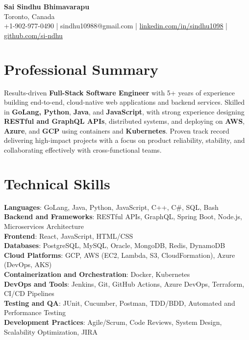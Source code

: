 \documentclass[letterpaper,11pt]{article}
\begin{document}
\begin{center}
  {\Large \textbf{Sai Sindhu Bhimavarapu}} \\
  Toronto, Canada \\
  +1-902-977-0490 \enspace | \enspace sindhu10988@gmail.com \enspace | \enspace \href{https://www.linkedin.com/in/sindhu1098/}{linkedin.com/in/sindhu1098} \enspace | \enspace \href{https://github.com/si-ndhu}{github.com/si-ndhu}
\end{center}

\section{Professional Summary}
  \begin{itemize}[leftmargin=0.15in, label={}]
    \small{\item{
     Results-driven \textbf{Full-Stack Software Engineer} with 5+ years of experience building end-to-end, cloud-native web applications and backend services. Skilled in \textbf{GoLang, Python}, \textbf{Java}, and \textbf{JavaScript}, with strong experience designing \textbf{RESTful and GraphQL APIs}, distributed systems, and deploying on \textbf{AWS}, \textbf{Azure}, and \textbf{GCP} using containers and \textbf{Kubernetes}. Proven track record delivering high-impact projects with a focus on product reliability, stability, and collaborating effectively with cross-functional teams.
    }}
  \end{itemize}
\vspace{-16pt}

\section{Technical Skills}
 \begin{itemize}[leftmargin=0.15in, label={}]
    \small{\item{
     \textbf{Languages}: GoLang, Java, Python, JavaScript, C++, C\#, SQL, Bash \\
     \textbf{Backend and Frameworks}: RESTful APIs, GraphQL, Spring Boot, Node.js, Microservices Architecture \\
     \textbf{Frontend}: React, JavaScript, HTML/CSS \\
     \textbf{Databases}: PostgreSQL, MySQL, Oracle, MongoDB, Redis, DynamoDB \\
     \textbf{Cloud Platforms}: GCP, AWS (EC2, Lambda, S3, CloudFormation), Azure (DevOps, AKS) \\
     \textbf{Containerization and Orchestration}: Docker, Kubernetes \\
     \textbf{DevOps and Tools}: Jenkins, Git, GitHub Actions, Azure DevOps, Terraform, CI/CD Pipelines \\
     \textbf{Testing and QA}: JUnit, Cucumber, Postman, TDD/BDD, Automated and Performance Testing \\
     \textbf{Development Practices}: Agile/Scrum, Code Reviews, System Design, Scalability Optimization, JIRA
    }}
 \end{itemize}
\vspace{-16pt}
\end{document}
